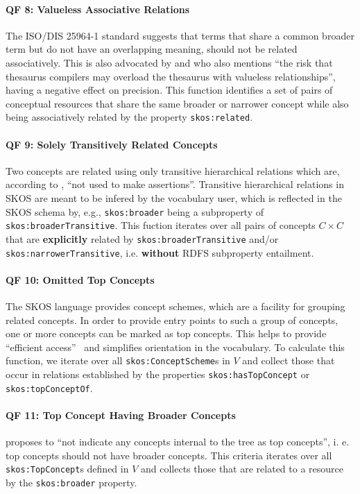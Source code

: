 \paragraph{\textbf{QF 8: Valueless Associative Relations}}
The ISO/DIS 25964-1 standard suggests that terms that share a common broader term but do not have an overlapping meaning, should not be related associatively. This is also advocated by \cite{Hedden2010} and \cite{Aitchison2000} who also mentions ``the risk that thesaurus compilers may overload the thesaurus with valueless relationships'', having a negative effect on precision. This function identifies a set of pairs of conceptual resources that share the same broader or narrower concept while also being associatively related by the property \texttt{skos:related}.

\paragraph{\textbf{QF 9: Solely Transitively Related Concepts}}
Two concepts are related using only transitive hierarchical relations which are, according to \cite{SkosReference2008}, ``not used to make assertions''. Transitive hierarchical relations in SKOS are meant to be infered by the vocabulary user, which is reflected in the SKOS schema by, e.g., \texttt{skos:broader} being a subproperty of \texttt{skos:broaderTransitive}. This fuction iterates over all pairs of concepts $C \times C$ that are \textbf{explicitly} related by \texttt{skos:broaderTransitive} and/or \texttt{skos:narrowerTransitive}, i.e. \textbf{without} RDFS subproperty entailment.

\paragraph{\textbf{QF 10: Omitted Top Concepts}}
The SKOS language provides concept schemes, which are a facility for grouping related concepts. In order to provide entry points to such a group of concepts, one or more concepts can be marked as top concepts. This helps to provide ``efficient access''~\cite{Isaac2009} and simplifies orientation in the vocabulary. To calculate this function, we iterate over all \texttt{skos:ConceptScheme}s in $V$ and collect those that occur in relations established by the properties \texttt{skos:hasTopConcept} or \texttt{skos:topConceptOf}.

\paragraph{\textbf{QF 11: Top Concept Having Broader Concepts}}
\cite{Allemang2011} proposes to ``not indicate any concepts internal to the tree as top concepts'', i. e. top concepts should not have broader concepts. This criteria iterates over all \texttt{skos:TopConcept}s defined in $V$ and collects those that are related to a resource by the \texttt{skos:broader} property.

